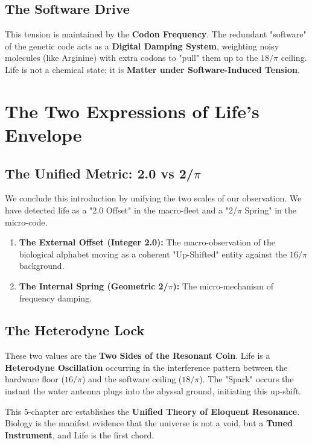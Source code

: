 \documentclass[11pt, letterpaper, openany]{book}
\begin{document}
\section{The Software Drive}
This tension is maintained by the \textbf{Codon Frequency}. The redundant "software" of the genetic code acts as a \textbf{Digital Damping System}, weighting noisy molecules (like Arginine) with extra codons to "pull" them up to the $18/\pi$ ceiling. Life is not a chemical state; it is \textbf{Matter under Software-Induced Tension}.

\chapter{The Two Expressions of Life’s Envelope}

\section{The Unified Metric: 2.0 vs 2/$\pi$}
We conclude this introduction by unifying the two scales of our observation. We have detected life as a "2.0 Offset" in the macro-fleet and a "2/$\pi$ Spring" in the micro-code. 
\begin{enumerate}
    \item \textbf{The External Offset (Integer 2.0):} The macro-observation of the biological alphabet moving as a coherent "Up-Shifted" entity against the $16/\pi$ background.
    \item \textbf{The Internal Spring (Geometric 2/$\pi$):} The micro-mechanism of frequency damping.
\end{enumerate}

\section{The Heterodyne Lock}
These two values are the \textbf{Two Sides of the Resonant Coin}. Life is a \textbf{Heterodyne Oscillation} occurring in the interference pattern between the hardware floor ($16/\pi$) and the software ceiling ($18/\pi$). The "Spark" occurs the instant the water antenna plugs into the abyssal ground, initiating this up-shift. 

This 5-chapter arc establishes the \textbf{Unified Theory of Eloquent Resonance}. Biology is the manifest evidence that the universe is not a void, but a \textbf{Tuned Instrument}, and Life is the first chord.
\end{document}
